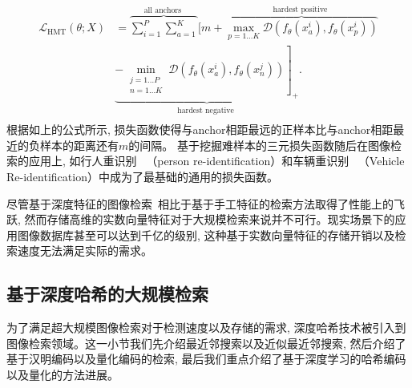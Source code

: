 \begin{equation}
    \begin{aligned}
         \mathcal{L}_{\mathrm{HMT}}(\theta ; X) &=\overbrace{\sum_{i=1}^P \sum_{a=1}^K}^{\text {all anchors }}[m+\overbrace{\max _{p=1 \ldots K} \mathcal{D}\left(f_\theta\left(x_a^i\right), f_\theta\left(x_p^i\right)\right)}^{\text {hardest positive }} \\
        & \underbrace{\left.-\min _{\substack{j=1 \ldots P \\
        n=1 \ldots K}} \mathcal{D}\left(f_\theta\left(x_a^i\right), f_\theta\left(x_n^j\right)\right)\right]_{+}}_{\text {hardest negative }}. \\
        \end{aligned}
        \label{eq:hardtri}
\end{equation}
根据如上的公式所示, 损失函数使得与anchor相距最远的正样本比与anchor相距最近的负样本的距离还有$m$的间隔。 基于挖掘难样本的三元损失函数随后在图像检索的应用上, 如行人重识别~\cite{fu2018one,luohaoreid, wang2018learning, sun2018beyond,rahimpour2017person,xu2018attention, fang2019bilinear} （person re-identification）和车辆重识别~\cite{chu2019vehicle, meng2020fine, meng2020parsing, liu2020beyond} （Vehicle Re-identification）中成为了最基础的通用的损失函数。\par
尽管基于深度特征的图像检索~\cite{wmz2021,zhq2017, zhanghao2018,mdm2014, rxl2018, cshuang2019, zhouye2017}相比于基于手工特征的检索方法取得了性能上的飞跃, 然而存储高维的实数向量特征对于大规模检索来说并不可行。现实场景下的应用图像数据库甚至可以达到千亿的级别, 这种基于实数向量特征的存储开销以及检索速度无法满足实际的需求。
\subsection{基于深度哈希的大规模检索}
为了满足超大规模图像检索对于检测速度以及存储的需求, 深度哈希技术被引入到图像检索领域。这一小节我们先介绍最近邻搜索以及近似最近邻搜索, 然后介绍了基于汉明编码以及量化编码的检索, 最后我们重点介绍了基于深度学习的哈希编码以及量化的方法进展。
